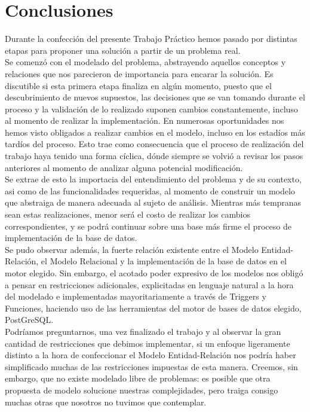 \section{Conclusiones}

\indent Durante la confección del presente Trabajo Práctico hemos pasado por distintas etapas para proponer una solución a partir de un problema real.\\
\indent Se comenzó con el modelado del problema, abstrayendo aquellos conceptos y relaciones que nos parecieron de importancia para encarar la solución. Es discutible si esta primera etapa finaliza en algún momento, puesto que el descubrimiento de nuevos supuestos, las decisiones que se van tomando durante el proceso y la validación de lo realizado suponen cambios constantemente, incluso al momento de realizar la implementación. En numerosas oportunidades nos hemos visto obligados a realizar cambios en el modelo, incluso en los estadíos más tardíos del proceso. Esto trae como consecuencia que el proceso de realización del trabajo haya tenido una forma cíclica, dónde siempre se volvió a revisar los pasos anteriores al momento de analizar alguna potencial modificación. \\
\indent Se extrae de esto la importacia del entendimiento del problema y de su contexto, asi como de las funcionalidades requeridas, al momento de construir un modelo que abstraiga de manera adecuada al sujeto de análisis. Mientras más tempranas sean estas realizaciones, menor será el costo de realizar los cambios correspondientes, y se podrá continuar sobre una base más firme el proceso de implementación de la base de datos.\\
\indent Se pudo observar además, la fuerte relación existente entre el Modelo Entidad-Relación, el Modelo Relacional y la implementación de la base de datos en el motor elegido. Sin embargo, el acotado poder expresivo de los modelos nos obligó a pensar en restricciones adicionales, explicitadas en lenguaje natural a la hora del modelado e implementadas mayoritariamente a través de Triggers y Funciones, haciendo uso de las herramientas del motor de bases de datos elegido, PostGreSQL.\\
\indent Podríamos preguntarnos, una vez finalizado el trabajo y al observar la gran cantidad de restricciones que debimos implementar, si un enfoque ligeramente distinto a la hora de confeccionar el Modelo Entidad-Relación nos podría haber simplificado muchas de las restricciones impuestas de esta manera. Creemos, sin embargo, que no existe modelado libre de problemas: es posible que otra propuesta de modelo solucione nuestras complejidades, pero traiga consigo muchas otras que nosotros no tuvimos que contemplar.\\   
